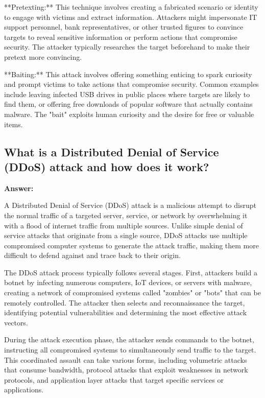 \documentclass[12pt,a4paper]{article}
\begin{document}
**Pretexting:** This technique involves creating a fabricated scenario or identity to engage with victims and extract information. Attackers might impersonate IT support personnel, bank representatives, or other trusted figures to convince targets to reveal sensitive information or perform actions that compromise security. The attacker typically researches the target beforehand to make their pretext more convincing.

**Baiting:** This attack involves offering something enticing to spark curiosity and prompt victims to take actions that compromise security. Common examples include leaving infected USB drives in public places where targets are likely to find them, or offering free downloads of popular software that actually contains malware. The "bait" exploits human curiosity and the desire for free or valuable items.

\subsection{What is a Distributed Denial of Service (DDoS) attack and how does it work?}

\textbf{Answer:}

A Distributed Denial of Service (DDoS) attack is a malicious attempt to disrupt the normal traffic of a targeted server, service, or network by overwhelming it with a flood of internet traffic from multiple sources. Unlike simple denial of service attacks that originate from a single source, DDoS attacks use multiple compromised computer systems to generate the attack traffic, making them more difficult to defend against and trace back to their origin.

The DDoS attack process typically follows several stages. First, attackers build a botnet by infecting numerous computers, IoT devices, or servers with malware, creating a network of compromised systems called "zombies" or "bots" that can be remotely controlled. The attacker then selects and reconnaissance the target, identifying potential vulnerabilities and determining the most effective attack vectors.

During the attack execution phase, the attacker sends commands to the botnet, instructing all compromised systems to simultaneously send traffic to the target. This coordinated assault can take various forms, including volumetric attacks that consume bandwidth, protocol attacks that exploit weaknesses in network protocols, and application layer attacks that target specific services or applications.
\end{document}
